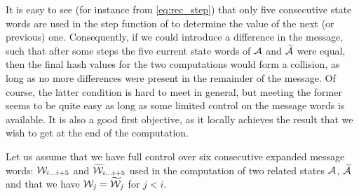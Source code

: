 It is easy to see (for instance from \autoref{eq:rec_step}) that only five consecutive state words are used in the step function of \sha to determine the value of the next (or previous) one. Consequently, if
we could introduce a difference in the message, such that after some steps the five current state words of $\mathcal{A}$ and $\mathcal{\widetilde A}$ were equal, then the final hash values for the
two computations would form a collision,
as long as no more differences were present in the remainder of the message. Of course, the latter condition is hard to meet in general, but meeting the former seems to be quite easy as long as some limited
control on the message words is available. It is also a good first objective, as it locally achieves the result that we wish to get at the end of the computation.

\medskip

Let us assume that we have full control over six consecutive expanded message words: $\mathcal{W}_{i\ldots i + 5}$ and $\mathcal{\widetilde W}_{i\ldots i + 5}$
used in the computation of two related \sha states $\mathcal{A}$, $\mathcal{\widetilde A}$ and that we have $\mathcal{W}_j = \mathcal{\widetilde W}_j$ for $j < i$.

